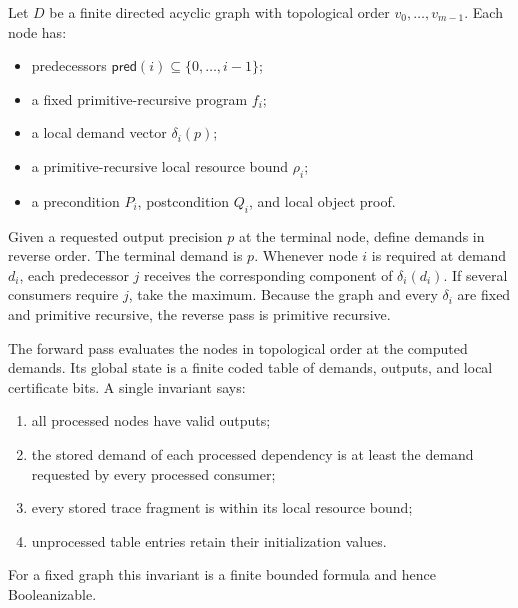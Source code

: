 Let \(D\) be a finite directed acyclic graph with topological order
\(v_0,\ldots,v_{m-1}\).  Each node has:

\begin{itemize}
  \item predecessors \(\mathsf{pred}(i)\subseteq\{0,\ldots,i-1\}\);
  \item a fixed primitive-recursive program \(f_i\);
  \item a local demand vector \(\delta_i(p)\);
  \item a primitive-recursive local resource bound \(\rho_i\);
  \item a precondition \(P_i\), postcondition \(Q_i\), and local object proof.
\end{itemize}

Given a requested output precision \(p\) at the terminal node, define demands in reverse order.  The terminal demand is \(p\).  Whenever node \(i\) is required at demand \(d_i\), each predecessor \(j\) receives the corresponding component of \(\delta_i(d_i)\).  If several consumers require \(j\), take the maximum.  Because the graph and every \(\delta_i\) are fixed and primitive recursive, the reverse pass is primitive recursive.

The forward pass evaluates the nodes in topological order at the computed demands.  Its global state is a finite coded table of demands, outputs, and local certificate bits.  A single invariant says:

\begin{enumerate}
  \item all processed nodes have valid outputs;
  \item the stored demand of each processed dependency is at least the demand requested by every processed consumer;
  \item every stored trace fragment is within its local resource bound;
  \item unprocessed table entries retain their initialization values.
\end{enumerate}

For a fixed graph this invariant is a finite bounded formula and hence Booleanizable.

